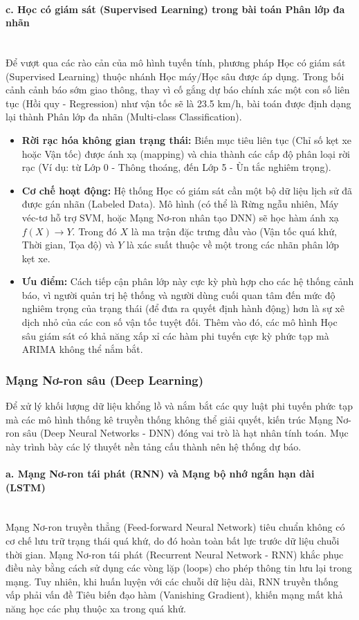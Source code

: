 \paragraph{c. Học có giám sát (Supervised Learning) trong bài toán Phân lớp đa nhãn} \mbox{} \\
Để vượt qua các rào cản của mô hình tuyến tính, phương pháp Học có giám sát (Supervised Learning) thuộc nhánh Học máy/Học sâu được áp dụng. Trong bối cảnh cảnh báo sớm giao thông, thay vì cố gắng dự báo chính xác một con số liên tục (Hồi quy - Regression) như vận tốc sẽ là 23.5 km/h, bài toán được định dạng lại thành Phân lớp đa nhãn (Multi-class Classification).
\begin{itemize}
    \item \textbf{Rời rạc hóa không gian trạng thái:} Biến mục tiêu liên tục (Chỉ số kẹt xe hoặc Vận tốc) được ánh xạ (mapping) và chia thành các cấp độ phân loại rời rạc (Ví dụ: từ Lớp 0 - Thông thoáng, đến Lớp 5 - Ùn tắc nghiêm trọng).
    \item \textbf{Cơ chế hoạt động:} Hệ thống Học có giám sát cần một bộ dữ liệu lịch sử đã được gán nhãn (Labeled Data). Mô hình (có thể là Rừng ngẫu nhiên, Máy véc-tơ hỗ trợ SVM, hoặc Mạng Nơ-ron nhân tạo DNN) sẽ học hàm ánh xạ $f(X) \rightarrow Y$. Trong đó $X$ là ma trận đặc trưng đầu vào (Vận tốc quá khứ, Thời gian, Tọa độ) và $Y$ là xác suất thuộc về một trong các nhãn phân lớp kẹt xe.
    \item \textbf{Ưu điểm:} Cách tiếp cận phân lớp này cực kỳ phù hợp cho các hệ thống cảnh báo, vì người quản trị hệ thống và người dùng cuối quan tâm đến mức độ nghiêm trọng của trạng thái (để đưa ra quyết định hành động) hơn là sự xê dịch nhỏ của các con số vận tốc tuyệt đối. Thêm vào đó, các mô hình Học sâu giám sát có khả năng xấp xỉ các hàm phi tuyến cực kỳ phức tạp mà ARIMA không thể nắm bắt.
\end{itemize}

\subsubsection{Mạng Nơ-ron sâu (Deep Learning)}
Để xử lý khối lượng dữ liệu khổng lồ và nắm bắt các quy luật phi tuyến phức tạp mà các mô hình thống kê truyền thống không thể giải quyết, kiến trúc Mạng Nơ-ron sâu (Deep Neural Networks - DNN) đóng vai trò là hạt nhân tính toán. Mục này trình bày các lý thuyết nền tảng cấu thành nên hệ thống dự báo.

\paragraph{a. Mạng Nơ-ron tái phát (RNN) và Mạng bộ nhớ ngắn hạn dài (LSTM)} \mbox{} \\
Mạng Nơ-ron truyền thẳng (Feed-forward Neural Network) tiêu chuẩn không có cơ chế lưu trữ trạng thái quá khứ, do đó hoàn toàn bất lực trước dữ liệu chuỗi thời gian. Mạng Nơ-ron tái phát (Recurrent Neural Network - RNN) khắc phục điều này bằng cách sử dụng các vòng lặp (loops) cho phép thông tin lưu lại trong mạng. Tuy nhiên, khi huấn luyện với các chuỗi dữ liệu dài, RNN truyền thống vấp phải vấn đề Tiêu biến đạo hàm (Vanishing Gradient), khiến mạng mất khả năng học các phụ thuộc xa trong quá khứ.

